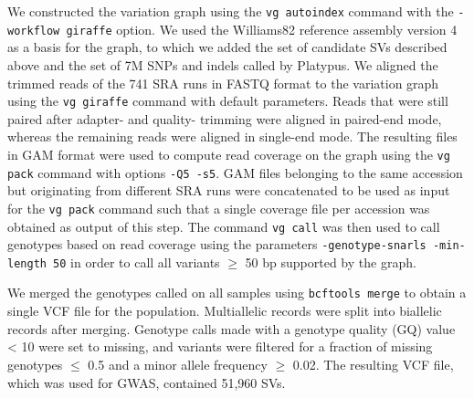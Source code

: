 \documentclass[12pt]{article}
\begin{document}
We constructed the variation graph using the \texttt{vg autoindex} command with
the \texttt{-\-workflow giraffe} option. We used the Williams82 reference
assembly version 4 as a basis for the graph, to which we added the set of
candidate SVs described above and the set of 7M SNPs and indels called by
Platypus.  We aligned the trimmed reads of the 741 SRA runs in FASTQ format to
the variation graph using the \texttt{vg giraffe} command with default
parameters. Reads that were still paired after adapter- and quality- trimming
were aligned in paired-end mode, whereas the remaining reads were aligned in
single-end mode. The resulting files in GAM format were used to compute read
coverage on the graph using the \texttt{vg pack} command with options
\texttt{-Q5 -s5}. GAM files belonging to the same accession but originating
from different SRA runs were concatenated to be used as input for the
\texttt{vg pack} command such that a single coverage file per accession was
obtained as output of this step. The command \texttt{vg call} was then used to
call genotypes based on read coverage using the parameters
\texttt{-\-genotype-snarls -\-min-length 50} in order to call all variants
$\geq$ 50 bp supported by the graph.

We merged the genotypes called on all samples using \texttt{bcftools merge} to
obtain a single VCF file for the population. Multiallelic records were split
into biallelic records after merging. Genotype calls made with a genotype
quality (GQ) value < 10 were set to missing, and variants were filtered for a
fraction of missing genotypes $\leq$ 0.5 and a minor allele frequency $\geq$
0.02. The resulting VCF file, which was used for GWAS, contained 51,960 SVs.
\end{document}
